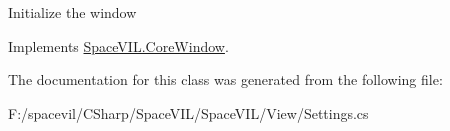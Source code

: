 Initialize the window 



Implements \mbox{\hyperlink{class_space_v_i_l_1_1_core_window_aa3cf4ac54d9651b1149584dc81042824}{Space\+V\+I\+L.\+Core\+Window}}.



The documentation for this class was generated from the following file\+:\begin{DoxyCompactItemize}
\item 
F\+:/spacevil/\+C\+Sharp/\+Space\+V\+I\+L/\+Space\+V\+I\+L/\+View/Settings.\+cs\end{DoxyCompactItemize}
